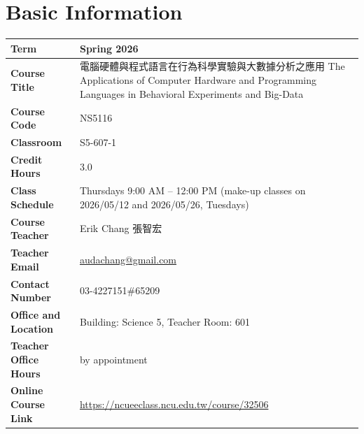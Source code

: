 \section{Basic Information}
\begin{tabularx}{\textwidth}{|l|X|}
\hline
\textbf{Term} & Spring 2026 \\ \hline
\textbf{Course Title} & 電腦硬體與程式語言在行為科學實驗與大數據分析之應用 \newline The Applications of Computer Hardware and Programming Languages in Behavioral Experiments and Big-Data \\ \hline
\textbf{Course Code} & NS5116 \\ \hline
\textbf{Classroom} & S5-607-1 \\ \hline
\textbf{Credit Hours} & 3.0 \\ \hline
\textbf{Class Schedule} & Thursdays 9:00 AM – 12:00 PM (make-up classes on 2026/05/12 and 2026/05/26, Tuesdays) \\ \hline
\textbf{Course Teacher} & Erik Chang 張智宏 \\ \hline
\textbf{Teacher Email} & \url{audachang@gmail.com} \\ \hline
\textbf{Contact Number} & 03-4227151\#65209 \\ \hline
\textbf{Office and Location} & Building: Science 5, Teacher Room: 601 \\ \hline
\textbf{Teacher Office Hours} & by appointment \\ \hline
\textbf{Online Course Link} & \url{https://ncueeclass.ncu.edu.tw/course/32506} \\ \hline
\end{tabularx}

